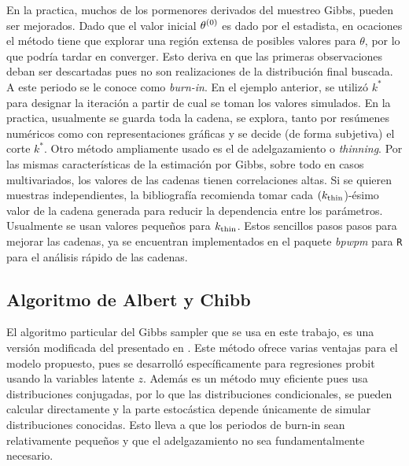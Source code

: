 \documentclass[../Main/Main.tex]{subfiles}
\begin{document}
En la practica, muchos de los pormenores derivados del muestreo Gibbs, pueden ser mejorados. Dado que el valor inicial $\theta^{(0)}$ es dado por el estadista, en ocaciones el método tiene que explorar una región extensa de posibles valores para $\theta$, por lo que podría tardar en converger. Esto deriva en que las primeras observaciones deban ser descartadas pues no son realizaciones de la distribución final buscada. A este periodo se le conoce como \textit{burn-in}. En el ejemplo anterior, se utilizó $k^*$ para designar la iteración a partir de cual se toman los valores simulados. En la practica, usualmente se guarda toda la cadena, se explora, tanto por resúmenes numéricos como con representaciones gráficas y se decide (de forma subjetiva) el corte  $k^*$. Otro método ampliamente usado es el de adelgazamiento o \textit{thinning}. Por las mismas características de la estimación por Gibbs, sobre todo en casos multivariados, los valores de las cadenas tienen correlaciones altas. Si se quieren muestras independientes, la bibliografía recomienda tomar cada $(k_{\text{thin}}$)-ésimo valor de la cadena generada para reducir la dependencia entre los parámetros. Usualmente se usan valores pequeños para $k_{\text{thin}}$.  Estos sencillos pasos pasos para mejorar las cadenas, ya se encuentran implementados en el paquete \textit{bpwpm} para \verb|R| para el análisis rápido de las cadenas.

\subsection{Algoritmo de Albert y Chibb}
El algoritmo particular del Gibbs sampler que se usa en este trabajo, es una versión modificada del presentado en \autocite{albert1993bayesian}. Este método ofrece varias ventajas para el modelo propuesto, pues se desarrolló específicamente para regresiones probit usando la variables latente $z$. Además es un método muy eficiente pues usa distribuciones conjugadas, por lo que las distribuciones condicionales, se pueden calcular directamente y la parte estocástica depende únicamente de simular distribuciones conocidas. Esto lleva a que los periodos de burn-in sean relativamente pequeños y que el adelgazamiento no sea fundamentalmente necesario.\\
\end{document}
